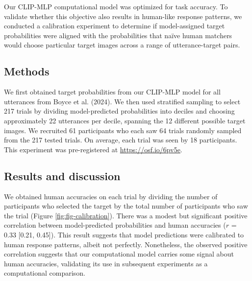 \documentclass[10pt, letterpaper]{article}
\begin{document}
Our CLIP-MLP computational model was optimized for task accuracy. To
validate whether this objective also results in human-like response
patterns, we conducted a calibration experiment to determine if
model-assigned target probabilities were aligned with the probabilities
that naïve human matchers would choose particular target images across a
range of utterance-target pairs.

\subsection{Methods}\label{methods}

We first obtained target probabilities from our CLIP-MLP model for all
utterances from Boyce et al. (2024). We then used stratified sampling to
select 217 trials by dividing model-predicted probabilities into deciles
and choosing approximately 22 utterances per decile, spanning the 12
different possible target images. We recruited 61 participants who each
saw 64 trials randomly sampled from the 217 tested trials. On average,
each trial was seen by 18 participants. This experiment was
pre-registered at \url{https://osf.io/6pv5e}.

\subsection{Results and discussion}\label{results-and-discussion}

We obtained human accuracies on each trial by dividing the number of
participants who selected the target by the total number of participants
who saw the trial (Figure \ref{fig:fig-calibration}). There was a modest
but significant positive correlation between model-predicted
probabilities and human accuracies (\(r\) = 0.33 {[}0.21, 0.45{]}). This
result suggests that model predictions were calibrated to human response
patterns, albeit not perfectly. Nonetheless, the observed positive
correlation suggests that our computational model carries some signal
about human accuracies, validating its use in subsequent experiments as
a computational comparison.
\end{document}
